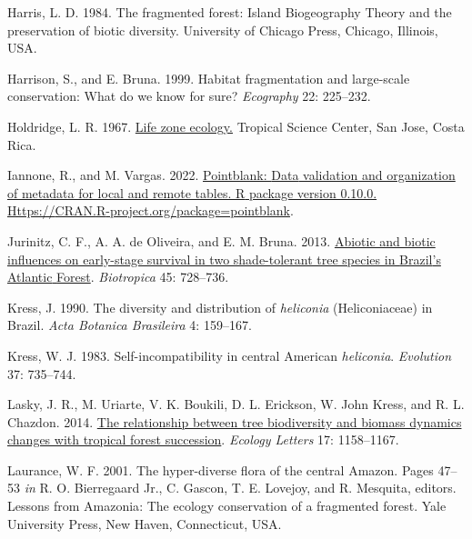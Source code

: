 \documentclass[
  12pt,
  man, donotrepeattitle]{apa6}
\newlength{\cslhangindent}
\newlength{\cslentryspacingunit} %
\newenvironment{CSLReferences}[2] %
 {%
  \setlength{\parindent}{0pt}
  \ifodd #1
  \let\oldpar\par
  \def\par{\hangindent=\cslhangindent\oldpar}
  \fi
  \setlength{\parskip}{#2\cslentryspacingunit}
 }%
 {}
\begin{document}
\begin{CSLReferences}{1}{0}
\leavevmode{}%
Harris, L. D. 1984. The fragmented forest: {Island} {Biogeography} {Theory} and the preservation of biotic diversity. University of Chicago Press, Chicago, Illinois, USA.

\leavevmode{}%
Harrison, S., and E. Bruna. 1999. Habitat fragmentation and large-scale conservation: What do we know for sure? \emph{Ecography} 22: 225--232.

\leavevmode{}%
Holdridge, L. R. 1967. \href{https://www.cabdirect.org/cabdirect/abstract/19670604180}{Life zone ecology.} Tropical Science Center, San Jose, Costa Rica.

\leavevmode{}%
Iannone, R., and M. Vargas. 2022. \href{https://CRAN.R-project.org/package=pointblank}{Pointblank: {Data} validation and organization of metadata for local and remote tables. {R} package version 0.10.0. Https://{CRAN}.{R}-project.org/package=pointblank}.

\leavevmode{}%
Jurinitz, C. F., A. A. de Oliveira, and E. M. Bruna. 2013. \href{https://doi.org/10.1111/btp.12058}{Abiotic and biotic influences on early-stage survival in two shade-tolerant tree species in {Brazil}'s {Atlantic} {Forest}}. \emph{Biotropica} 45: 728--736.

\leavevmode{}%
Kress, J. 1990. The diversity and distribution of \emph{heliconia} ({Heliconiaceae}) in {Brazil}. \emph{Acta Botanica Brasileira} 4: 159--167.

\leavevmode{}%
Kress, W. J. 1983. Self-incompatibility in central {American} \emph{heliconia}. \emph{Evolution} 37: 735--744.

\leavevmode{}%
Lasky, J. R., M. Uriarte, V. K. Boukili, D. L. Erickson, W. John Kress, and R. L. Chazdon. 2014. \href{https://doi.org/10.1111/ele.12322}{The relationship between tree biodiversity and biomass dynamics changes with tropical forest succession}. \emph{Ecology Letters} 17: 1158--1167.

\leavevmode{}%
Laurance, W. F. 2001. The hyper-diverse flora of the central {Amazon}. Pages 47--53 \emph{in} R. O. Bierregaard Jr., C. Gascon, T. E. Lovejoy, and R. Mesquita, editors. Lessons from {Amazonia}: {The} ecology conservation of a fragmented forest. Yale University Press, New Haven, Connecticut, USA.


\end{CSLReferences}
\end{document}
